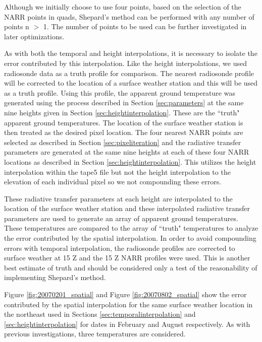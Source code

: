 \documentclass{book}
\begin{document}
Although we initially choose to use four points, based on the selection of the NARR points in quads, Shepard's method can be performed with any number of points n $>$ 1.  The number of points to be used can be further investigated in later optimizations.

As with both the temporal and height interpolations, it is necessary to isolate the error contributed by this interpolation.  Like the height interpolations, we used radiosonde data as a truth profile for comparison.  The nearest radiosonde profile will be corrected to the location of a surface weather station and this will be used as a truth profile.  Using this profile, the apparent ground temperature was generated using the process described in Section \ref{sec:parameters} at the same nine heights given in Section \ref{sec:heightinterpolation}.  These are the ``truth" apparent ground temperatures.  The location of the surface weather station is then treated as the desired pixel location.  The four nearest NARR points are selected as described in Section \ref{sec:pixeliteration} and the radiative transfer parameters are generated at the same nine heights at each of these four NARR locations as described in Section \ref{sec:heightinterpolation}.  This utilizes the height interpolation within the tape5 file but not the height interpolation to the elevation of each individual pixel so we not compounding these errors.

These radiative transfer parameters at each height are interpolated to the location of the surface weather station and these interpolated radiative transfer parameters are used to generate an array of apparent ground temperatures.  These temperatures are compared to the array of ``truth" temperatures to analyze the error contributed by the spatial interpolation.  In order to avoid compounding errors with temporal interpolation, the radiosonde profiles are corrected to surface weather at 15 Z and the 15 Z NARR profiles were used.  This is another best estimate of truth and should be considered only a test of the reasonability of implementing Shepard's method.

Figure \ref{fig:20070201_spatial} and Figure \ref{fig:20070802_spatial} show the error contributed by the spatial interpolation for the same surface weather location in the northeast used in Sections \ref{sec:temporalinterpolation} and \ref{sec:heightinterpolation} for dates in February and August respectively.  As with previous investigations, three temperatures are considered.
\end{document}
